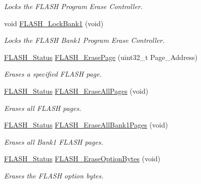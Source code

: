 \begin{DoxyCompactItemize}
\begin{DoxyCompactList}\small\item\em Locks the F\+L\+A\+SH Program Erase Controller. \end{DoxyCompactList}\item 
void \hyperlink{group___f_l_a_s_h___private___functions_gafe4188ab9eb12c046970660f65a3faf9}{F\+L\+A\+S\+H\+\_\+\+Lock\+Bank1} (void)
\begin{DoxyCompactList}\small\item\em Locks the F\+L\+A\+SH Bank1 Program Erase Controller. \end{DoxyCompactList}\item 
\hyperlink{group___f_l_a_s_h___exported___types_gadc63a6f3404ff1f71229a66915e9cdc0}{F\+L\+A\+S\+H\+\_\+\+Status} \hyperlink{group___f_l_a_s_h___private___functions_ga13a2ca18bfb3d5fb827a2751799f8451}{F\+L\+A\+S\+H\+\_\+\+Erase\+Page} (uint32\+\_\+t Page\+\_\+\+Address)
\begin{DoxyCompactList}\small\item\em Erases a specified F\+L\+A\+SH page. \end{DoxyCompactList}\item 
\hyperlink{group___f_l_a_s_h___exported___types_gadc63a6f3404ff1f71229a66915e9cdc0}{F\+L\+A\+S\+H\+\_\+\+Status} \hyperlink{group___f_l_a_s_h___private___functions_gab2e6dea62c72b3e47c17512579d37498}{F\+L\+A\+S\+H\+\_\+\+Erase\+All\+Pages} (void)
\begin{DoxyCompactList}\small\item\em Erases all F\+L\+A\+SH pages. \end{DoxyCompactList}\item 
\hyperlink{group___f_l_a_s_h___exported___types_gadc63a6f3404ff1f71229a66915e9cdc0}{F\+L\+A\+S\+H\+\_\+\+Status} \hyperlink{group___f_l_a_s_h___private___functions_ga2036728450ee18e789b25fe3fd9c80ee}{F\+L\+A\+S\+H\+\_\+\+Erase\+All\+Bank1\+Pages} (void)
\begin{DoxyCompactList}\small\item\em Erases all Bank1 F\+L\+A\+SH pages. \end{DoxyCompactList}\item 
\hyperlink{group___f_l_a_s_h___exported___types_gadc63a6f3404ff1f71229a66915e9cdc0}{F\+L\+A\+S\+H\+\_\+\+Status} \hyperlink{group___f_l_a_s_h___private___functions_ga152768609e85d74a9d8474be8dc2874b}{F\+L\+A\+S\+H\+\_\+\+Erase\+Option\+Bytes} (void)
\begin{DoxyCompactList}\small\item\em Erases the F\+L\+A\+SH option bytes. \end{DoxyCompactList}\item 

\end{DoxyCompactItemize}
